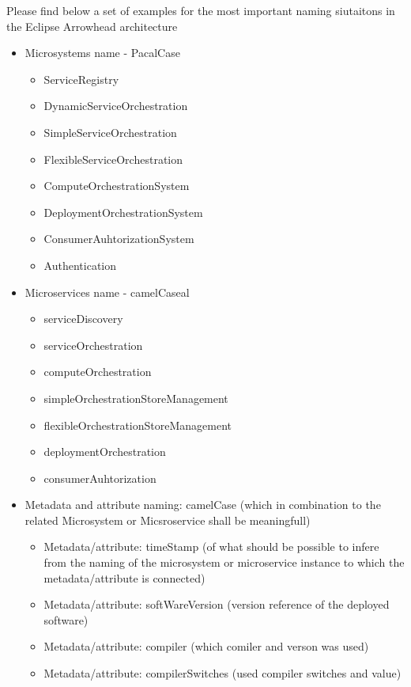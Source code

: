 \documentclass[a4paper]{arrowhead}
\begin{document}
Please find below a set of examples for the most important naming
siutaitons in the Eclipse Arrowhead architecture
\begin{itemize}
\item Microsystems name - PacalCase
  \begin{itemize}
  \item ServiceRegistry
  \item DynamicServiceOrchestration
  \item SimpleServiceOrchestration
  \item FlexibleServiceOrchestration
  \item ComputeOrchestrationSystem
  \item DeploymentOrchestrationSystem
  \item ConsumerAuhtorizationSystem
  \item Authentication
  \end{itemize}
  
\item Microservices name - camelCaseal
  \begin{itemize}
  \item serviceDiscovery
  \item serviceOrchestration
  \item computeOrchestration
  \item simpleOrchestrationStoreManagement
  \item flexibleOrchestrationStoreManagement
  \item deploymentOrchestration
  \item consumerAuhtorization
  \end{itemize}

 \item Metadata and attribute naming: camelCase (which in combination to the
  related Microsystem or Micsroservice shall be meaningfull)
  \begin{itemize}
  \item Metadata/attribute: timeStamp (of what should be possible to infere from
    the naming of the microsystem or microservice instance to which the
    metadata/attribute is connected)
  \item Metadata/attribute: softWareVersion (version reference of the
    deployed software)
  \item Metadata/attribute: compiler (which comiler and verson was used)
  \item Metadata/attribute: compilerSwitches (used compiler switches
    and value) 
  \end{itemize}

\end{itemize} 
\end{document}
